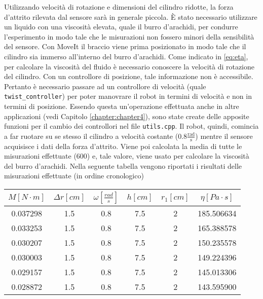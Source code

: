 Utilizzando velocit\`{a} di rotazione e dimensioni del cilindro ridotte, la forza d'attrito rilevata dal sensore sar\`{a} in generale 
piccola. \`{E} stato necessario utilizzare un liquido con una viscosit\`{a} elevata, quale il burro d'arachidi, per condurre l'esperimento in modo tale 
che le misurazioni non fossero minori della sensibilit\`{a} del sensore. 
Con MoveIt il braccio viene prima posizionato in modo tale che il cilindro sia immerso all'interno del burro d'arachidi. 
Come indicato in \ref{eq:eta}, per calcolare la viscosit\`{a} del fluido \`{e} necessario conoscere 
la velocit\`{a} di rotazione del cilindro. Con un controllore di posizione, tale informazione non \`{e} accessibile. 
Pertanto \`{e} necessario passare ad un controllore di velocit\`{a} (quale \verb|twist_controller|) per poter manovrare il robot in 
termini di velocit\`{a} e non in termini di posizione. Essendo questa un'operazione effettuata anche in altre applicazioni (vedi  
Capitolo \ref{chapter:chapter4}), sono state create delle apposite funzioni per il cambio dei controllori nel file \verb|utils.cpp|. 
Il robot, quindi, comincia a far ruotare su se stesso il cilindro a velocit\`{a} costante ($0.8 \frac{\text{rad}}{\text{s}}$) mentre 
il sensore acquisisce i dati della forza d'attrito. 
Viene poi calcolata la media di tutte le misurazioni effettuate (600) e, tale valore, viene usato per calcolare la viscosit\`{a} 
del burro d'arachidi. 
Nella seguente tabella vengono riportati i risultati delle misurazioni effettuate (in ordine cronologico)
\begin{center}
    \begin{tabular}{ ||c|c|c|c|c|c|| } 
     \hline
     $M \left[N \cdot m\right]$ & $\Delta r \left[cm\right]$ & $\omega \left[\frac{rad}{s}\right]$ & $h \left[cm\right]$ & $r_{1} \left[cm\right]$ & $\eta \left[Pa \cdot s\right]$\\
     \hline\hline 
     0.037298 & 1.5 & 0.8 & 7.5 & 2 & 185.506634 \\ 
     0.033253 & 1.5 & 0.8 & 7.5 & 2 & 165.388578 \\ 
     0.030207 & 1.5 & 0.8 & 7.5 & 2 & 150.235578 \\ 
     0.030003 & 1.5 & 0.8 & 7.5 & 2 & 149.224396 \\ 
     0.029157 & 1.5 & 0.8 & 7.5 & 2 & 145.013306 \\ 
     0.028872 & 1.5 & 0.8 & 7.5 & 2 & 143.595900 \\ 
     \hline
    \end{tabular}
\end{center}
